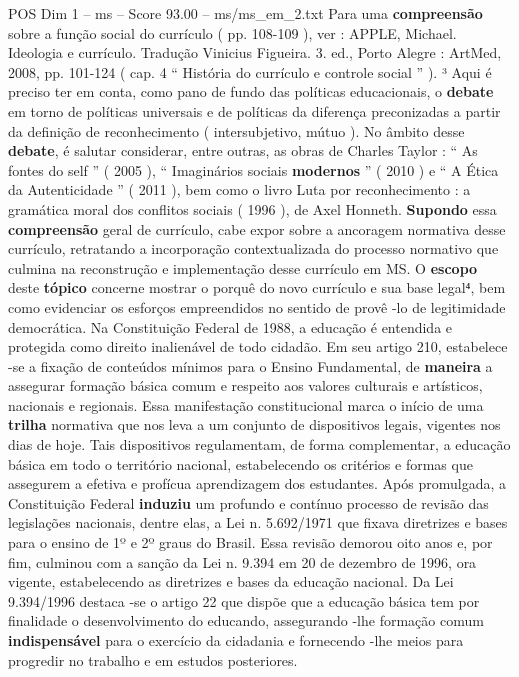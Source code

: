 \begin{textsample}{POS Dim 1 – ms – Score 93.00 – ms/ms\_em\_2.txt}
Para uma \textbf{compreensão} sobre a função social do currículo ( pp. 108-109 ), ver : APPLE, Michael.
Ideologia e currículo.
Tradução Vinicius Figueira. 3. ed., Porto Alegre : ArtMed, 2008, pp. 101-124 ( cap. 4 “ História do currículo e controle social ” ). ³ Aqui é preciso ter em conta, como pano de fundo das políticas educacionais, o \textbf{debate} em torno de políticas universais e de políticas da diferença preconizadas a partir da definição de reconhecimento ( intersubjetivo, mútuo ).
No âmbito desse \textbf{debate}, é salutar considerar, entre outras, as obras de Charles Taylor : “ As fontes do self ” ( 2005 ), “ Imaginários sociais \textbf{modernos} ” ( 2010 ) e “ A Ética da Autenticidade ” ( 2011 ), bem como o livro Luta por reconhecimento : a gramática moral dos conflitos sociais ( 1996 ), de Axel Honneth. \textbf{Supondo} essa \textbf{compreensão} geral de currículo, cabe expor sobre a ancoragem normativa desse currículo, retratando a incorporação contextualizada do processo normativo que culmina na reconstrução e implementação desse currículo em MS.
O \textbf{escopo} deste \textbf{tópico} concerne mostrar o porquê do novo currículo e sua base legal⁴, bem como evidenciar os esforços empreendidos no sentido de provê -lo de legitimidade democrática.
Na Constituição Federal de 1988, a educação é entendida e protegida como direito inalienável de todo cidadão.
Em seu artigo 210, estabelece -se a fixação de conteúdos mínimos para o Ensino Fundamental, de \textbf{maneira} a assegurar formação básica comum e respeito aos valores culturais e artísticos, nacionais e regionais.
Essa manifestação constitucional marca o início de uma \textbf{trilha} normativa que nos leva a um conjunto de dispositivos legais, vigentes nos dias de hoje.
Tais dispositivos regulamentam, de forma complementar, a educação básica em todo o território nacional, estabelecendo os critérios e formas que assegurem a efetiva e profícua aprendizagem dos estudantes.
Após promulgada, a Constituição Federal \textbf{induziu} um profundo e contínuo processo de revisão das legislações nacionais, dentre elas, a Lei n. 5.692/1971 que fixava diretrizes e bases para o ensino de 1º e 2º graus do Brasil.
Essa revisão demorou oito anos e, por fim, culminou com a sanção da Lei n. 9.394 em 20 de dezembro de 1996, ora vigente, estabelecendo as diretrizes e bases da educação nacional.
Da Lei 9.394/1996 destaca -se o artigo 22 que dispõe que a educação básica tem por finalidade o desenvolvimento do educando, assegurando -lhe formação comum \textbf{indispensável} para o exercício da cidadania e fornecendo -lhe meios para progredir no trabalho e em estudos posteriores.

\end{textsample}
